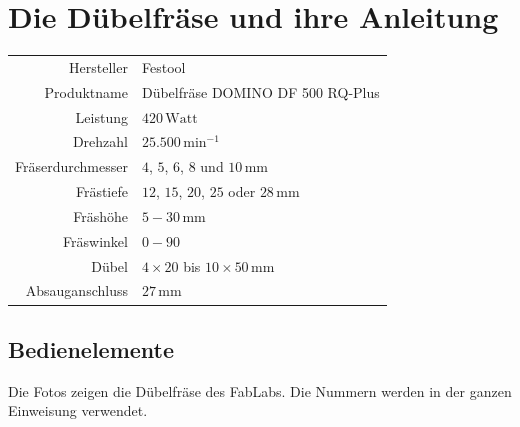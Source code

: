 \documentclass{\basedir/fablab-document}
\begin{document}
	\newpage


	\renewcommand{\contentsname}{Inhaltsverzeichnis / Arbeitsablauf}
	\setcounter{tocdepth}{2}
	\tableofcontents
	\newpage

	\section{Die Dübelfräse und ihre Anleitung}

	\begin{center}
		\begin{tabular}{r|l}
			Hersteller & Festool \\
			Produktname & Dübelfräse DOMINO DF 500 RQ-Plus \\
			Leistung & $420\,\mathrm{Watt}$ \\
			Drehzahl & $25.500\,\mathrm{min}^{-1}$ \\
			Fräserdurchmesser & $4$, $5$, $6$, $8$ und $10\,\mathrm{mm}$ \\
			Frästiefe & $12$, $15$, $20$, $25$ oder $28\,\mathrm{mm}$ \\
			Fräshöhe & $5 - 30\,\mathrm{mm}$ \\
			Fräswinkel & $0 - 90$\textdegree \\
			Dübel & $4 \times 20$ bis $10 \times 50\,\mathrm{mm}$ \\
			Absauganschluss & $27\,\mathrm{mm}$ \\
		\end{tabular}
	\end{center}

	\subsection{Bedienelemente}
	\label{sec:bedienelemente}

	Die Fotos zeigen die Dübelfräse des FabLabs. Die Nummern werden in der ganzen Einweisung verwendet.

	\begin{center}
		
	\end{center}
\end{document}
